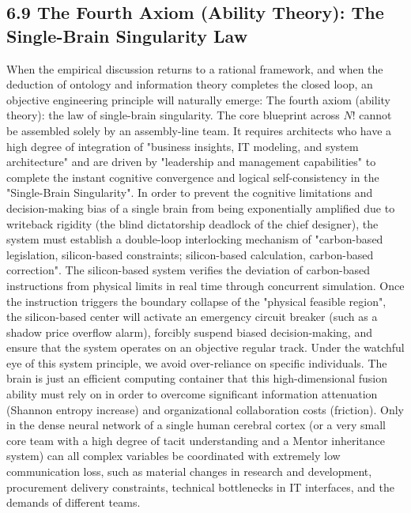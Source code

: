\documentclass[11pt,a4paper]{article}
\begin{document}
\subsection*{6.9 The Fourth Axiom (Ability Theory): The Single-Brain Singularity Law}


When the empirical discussion returns to a rational framework, and when the deduction of ontology and information theory completes the closed loop, an objective engineering principle will naturally emerge: The fourth axiom (ability theory): the law of single-brain singularity. The core blueprint across $N!$ cannot be assembled solely by an assembly-line team. It requires architects who have a high degree of integration of "business insights, IT modeling, and system architecture" and are driven by "leadership and management capabilities" to complete the instant cognitive convergence and logical self-consistency in the "Single-Brain Singularity". In order to prevent the cognitive limitations and decision-making bias of a single brain from being exponentially amplified due to writeback rigidity (the blind dictatorship deadlock of the chief designer), the system must establish a double-loop interlocking mechanism of "carbon-based legislation, silicon-based constraints; silicon-based calculation, carbon-based correction". The silicon-based system verifies the deviation of carbon-based instructions from physical limits in real time through concurrent simulation. Once the instruction triggers the boundary collapse of the "physical feasible region", the silicon-based center will activate an emergency circuit breaker (such as a shadow price overflow alarm), forcibly suspend biased decision-making, and ensure that the system operates on an objective regular track. Under the watchful eye of this system principle, we avoid over-reliance on specific individuals. The brain is just an efficient computing container that this high-dimensional fusion ability must rely on in order to overcome significant information attenuation (Shannon entropy increase) and organizational collaboration costs (friction). Only in the dense neural network of a single human cerebral cortex (or a very small core team with a high degree of tacit understanding and a Mentor inheritance system) can all complex variables be coordinated with extremely low communication loss, such as material changes in research and development, procurement delivery constraints, technical bottlenecks in IT interfaces, and the demands of different teams.
\end{document}
